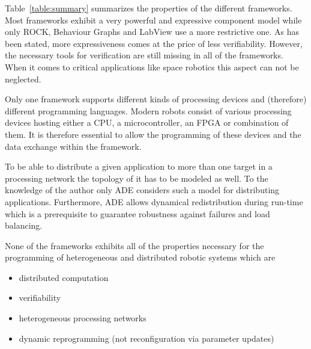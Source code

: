 \documentclass[a4paper,twocolumn]{esapub2005} %
\begin{document}
Table~\ref{table:summary} summarizes the properties of the different frameworks.
Most frameworks exhibit a very powerful and expressive component model while only ROCK, Behaviour Graphs and LabView use a more restrictive one.
As has been stated, more expressiveness comes at the price of less verifiability.
However, the necessary tools for verification are still missing in all of the frameworks.
When it comes to critical applications like space robotics this aspect can not be neglected.

Only one framework supports different kinds of processing devices and (therefore) different programming languages.
Modern robots consist of various processing devices hosting either a CPU, a microcontroller, an FPGA or combination of them.
It is therefore essential to allow the programming of these devices and the data exchange within the framework.

To be able to distribute a given application to more than one target in a processing network the topology of it has to be modeled as well.
To the knowledge of the author only ADE considers such a model for distributing applications.
Furthermore, ADE allows dynamical redistribution during run-time which is a prerequisite to guarantee robustness against failures and load balancing.

None of the frameworks exhibits all of the properties necessary for the programming of heterogeneous and distributed robotic systems which are
\begin{itemize}
    \item distributed computation
    \item verifiability
    \item heterogeneous processing networks
    \item dynamic reprogramming (not reconfiguration via parameter updates)
\end{itemize}
\end{document}
